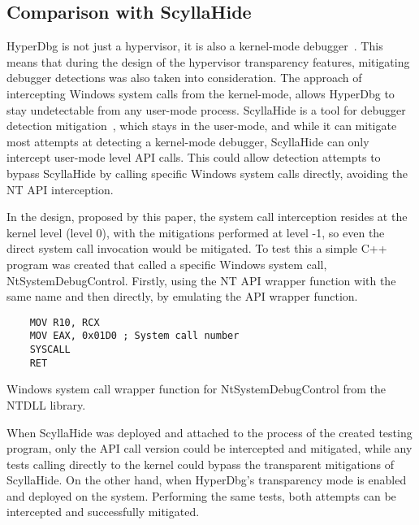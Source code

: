 \subsection{Comparison with ScyllaHide}\label{scyllahide-comparison}
HyperDbg is not just a hypervisor, it is also a kernel-mode debugger~\cite{karvandi2022hyperdbg}. This means that during the design of 
the hypervisor transparency features, mitigating debugger detections was also taken into consideration. The approach of intercepting Windows system calls 
from the kernel-mode, allows HyperDbg to stay undetectable from any user-mode process. ScyllaHide is a tool for debugger detection mitigation~\cite{scyllahide}, 
which stays in the user-mode, and while it can mitigate most attempts at detecting a kernel-mode debugger, ScyllaHide can only intercept user-mode level API calls. 
This could allow detection attempts to bypass ScyllaHide by calling specific Windows system calls directly, avoiding the NT API interception. 

In the design, proposed by this paper, the system call interception resides at the kernel level (level 0), with the mitigations performed at level -1, 
so even the direct system call invocation would be mitigated. To test this a simple C++ program was created that called a specific Windows system call, 
NtSystemDebugControl. Firstly, using the NT API wrapper function with the same name and then directly, by emulating the API wrapper function.
\begin{listing}[!ht]

\begin{verbatim}
    MOV R10, RCX
    MOV EAX, 0x01D0 ; System call number
    SYSCALL
    RET
\end{verbatim}
\caption{Windows system call wrapper function for NtSystemDebugControl from the NTDLL library.}
\label{lst:syscall-wrapper}
\end{listing}
When ScyllaHide was deployed and attached to the process of the created testing program, only the API call version could be intercepted and mitigated, 
while any tests calling directly to the kernel could bypass the transparent mitigations of ScyllaHide.
On the other hand, when HyperDbg's transparency mode is enabled and deployed on the system. Performing the same tests, both attempts can be intercepted and 
successfully mitigated.



